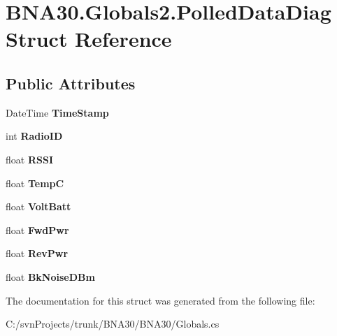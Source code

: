 \hypertarget{struct_b_n_a30_1_1_globals2_1_1_polled_data_diag}{}\section{B\+N\+A30.\+Globals2.\+Polled\+Data\+Diag Struct Reference}
\label{struct_b_n_a30_1_1_globals2_1_1_polled_data_diag}
\subsection*{Public Attributes}
\begin{DoxyCompactItemize}
\item 
\mbox{\label{struct_b_n_a30_1_1_globals2_1_1_polled_data_diag_ad18aa69914ee96f5b2bab633a1a0b3ad}} 
Date\+Time {\bfseries Time\+Stamp}
\item 
\mbox{\label{struct_b_n_a30_1_1_globals2_1_1_polled_data_diag_ae305bcd0b8339e7aeda50fec26c826f4}} 
int {\bfseries Radio\+ID}
\item 
\mbox{\label{struct_b_n_a30_1_1_globals2_1_1_polled_data_diag_af9bfa6f953084c1af2ffcc0844f270ce}} 
float {\bfseries R\+S\+SI}
\item 
\mbox{\label{struct_b_n_a30_1_1_globals2_1_1_polled_data_diag_a53a2dd58aea86f4197cde4bcf2c45937}} 
float {\bfseries TempC}
\item 
\mbox{\label{struct_b_n_a30_1_1_globals2_1_1_polled_data_diag_abc9e5d48cbd9163d5764bf11f94e0e1b}} 
float {\bfseries Volt\+Batt}
\item 
\mbox{\label{struct_b_n_a30_1_1_globals2_1_1_polled_data_diag_af7dd0112d8d40c1a80307b596cdcfe21}} 
float {\bfseries Fwd\+Pwr}
\item 
\mbox{\label{struct_b_n_a30_1_1_globals2_1_1_polled_data_diag_ad432a16fcaccd172ae9987c172da63d2}} 
float {\bfseries Rev\+Pwr}
\item 
\mbox{\label{struct_b_n_a30_1_1_globals2_1_1_polled_data_diag_a4a5ec353b405a93ecc761126db7019ab}} 
float {\bfseries Bk\+Noise\+D\+Bm}
\end{DoxyCompactItemize}


The documentation for this struct was generated from the following file\+:\begin{DoxyCompactItemize}
\item 
C\+:/svn\+Projects/trunk/\+B\+N\+A30/\+B\+N\+A30/Globals.\+cs\end{DoxyCompactItemize}
